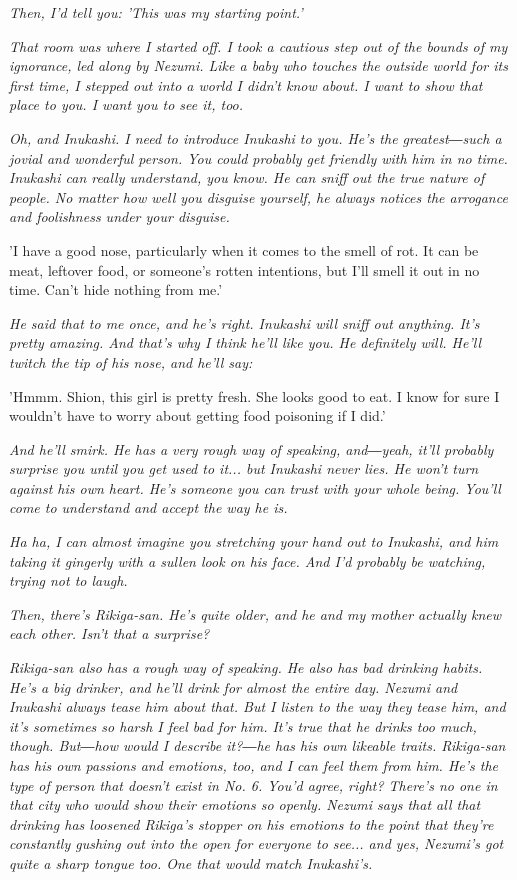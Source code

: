 \emph{Then, I'd tell you: 'This was my starting point.'}

\emph{That room was where I started off. I took a cautious step out of the
	bounds of my ignorance, led along by Nezumi. Like a baby who touches the
	outside world for its first time, I stepped out into a world I didn't
	know about. I want to show that place to you. I want you to see it, too.}

\emph{Oh, and Inukashi. I need to introduce Inukashi to you. He's the
	greatest―such a jovial and wonderful person. You could probably get
	friendly with him in no time. Inukashi can really understand, you know.
	He can sniff out the true nature of people. No matter how well you
	disguise yourself, he always notices the arrogance and foolishness under
	your disguise.}

'I have a good nose, particularly when it comes to the smell of rot. It
can be meat, leftover food, or someone's rotten intentions, but I'll
smell it out in no time. Can't hide nothing from me.'

\emph{He said that to me once, and he's right. Inukashi will sniff out
	anything. It's pretty amazing. And that's why I think he'll like you. He
	definitely will. He'll twitch the tip of his nose, and he'll say:}

'Hmmm. Shion, this girl is pretty fresh. She looks good to eat. I know
for sure I wouldn't have to worry about getting food poisoning if I
did.'

\emph{And he'll smirk. He has a very rough way of speaking, and―yeah, it'll
	probably surprise you until you get used to it... but Inukashi never
	lies. He won't turn against his own heart. He's someone you can trust
	with your whole being. You'll come to understand and accept the way he
	is.}

\emph{Ha ha, I can almost imagine you stretching your hand out to Inukashi,
	and him taking it gingerly with a sullen look on his face. And I'd
	probably be watching, trying not to laugh.}

\emph{Then, there's Rikiga-san. He's quite older, and he and my mother
	actually knew each other. Isn't that a surprise?}

\emph{Rikiga-san also has a rough way of speaking. He also has bad drinking
	habits. He's a big drinker, and he'll drink for almost the entire day.
	Nezumi and Inukashi always tease him about that. But I listen to the way
	they tease him, and it's sometimes so harsh I feel bad for him. It's
	true that he drinks too much, though. But―how would I describe it?―he
	has his own likeable traits. Rikiga-san has his own passions and
	emotions, too, and I can feel them from him. He's the type of person
	that doesn't exist in No. 6. You'd agree, right? There's no one in that
	city who would show their emotions so openly. Nezumi says that all that
	drinking has loosened Rikiga's stopper on his emotions to the point that
	they're constantly gushing out into the open for everyone to see... and
	yes, Nezumi's got quite a sharp tongue too. One that would match
	Inukashi's.}

